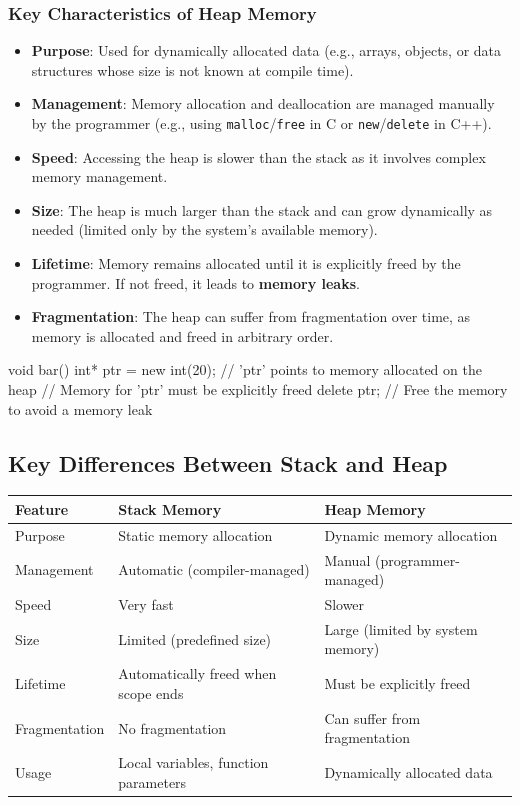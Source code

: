 \subsubsection{Key Characteristics of Heap Memory}
\begin{itemize}
    \item \textbf{Purpose}: Used for dynamically allocated data (e.g., arrays, objects, or data structures whose size is not known at compile time).
    \item \textbf{Management}: Memory allocation and deallocation are managed manually by the programmer (e.g., using \texttt{malloc}/\texttt{free} in C or \texttt{new}/\texttt{delete} in C++).
    \item \textbf{Speed}: Accessing the heap is slower than the stack as it involves complex memory management.
    \item \textbf{Size}: The heap is much larger than the stack and can grow dynamically as needed (limited only by the system's available memory).
    \item \textbf{Lifetime}: Memory remains allocated until it is explicitly freed by the programmer. If not freed, it leads to \textbf{memory leaks}.
    \item \textbf{Fragmentation}: The heap can suffer from fragmentation over time, as memory is allocated and freed in arbitrary order.
\end{itemize}

\begin{exampleblock}
    \begin{codeblock}[language=C++]
void bar() {
    int* ptr = new int(20); // 'ptr' points to memory allocated on the heap
    // Memory for 'ptr' must be explicitly freed
    delete ptr; // Free the memory to avoid a memory leak
}
    \end{codeblock}
\end{exampleblock}

\subsection{Key Differences Between Stack and Heap}

\begin{tabular}{|l|l|l|}
    \hline
    \textbf{Feature} & \textbf{Stack Memory} & \textbf{Heap Memory} \\ \hline
    Purpose & Static memory allocation & Dynamic memory allocation \\ \hline
    Management & Automatic (compiler-managed) & Manual (programmer-managed) \\ \hline
    Speed & Very fast & Slower \\ \hline
    Size & Limited (predefined size) & Large (limited by system memory) \\ \hline
    Lifetime & Automatically freed when scope ends & Must be explicitly freed \\ \hline
    Fragmentation & No fragmentation & Can suffer from fragmentation \\ \hline
    Usage & Local variables, function parameters & Dynamically allocated data \\ \hline
\end{tabular}

